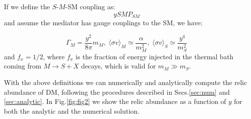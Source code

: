 \documentclass{article}
\def\to{\rightarrow}
\def\be{\begin{equation}}
\def\ee{\end{equation}}
\def\to{\rightarrow}
\begin{document}
If we define the $S$-$M$-SM coupling as:
\be
y S M P_{SM}
\ee
and assume the mediator has gauge couplings to the SM, we have:

\be
\Gamma_M  = \frac{y^2}{8 \pi} m_M, \; \langle \sigma v \rangle_M  \simeq \frac{\alpha}{m_M^2}, \; \langle \sigma v \rangle_S  \simeq \frac{y^4}{m_S^2}
\ee
and $f_x = 1/2$, where $f_x$ is the fraction of energy injected in the thermal bath coming from $M \to S + X$ decays, which
is valid for $m_M \gg m_S$.

With the above definitions we can numerically and analytically compute the relic abundance
of DM, following the procedures described in Secs.\ref{sec:num} and \ref{sec:analytic}.
In Fig.\ref{fig:fig2}  we show the relic abundance as a function of $y$ for both the
analytic and the numerical solution.
\end{document}
